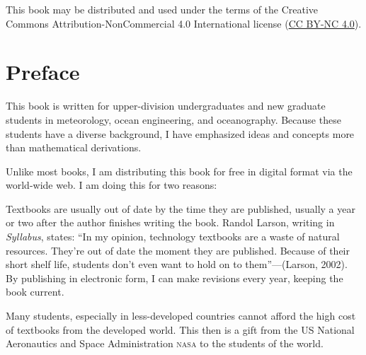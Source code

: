 
\vspace*{\fill}
\noindent{}This book may be distributed and used under the terms of the
Creative Commons Attribution-NonCommercial 4.0 International
license (\href{https://creativecommons.org/licenses/by-nc/4.0/legalcode}{CC BY-NC 4.0}).
\tableofcontents

\chapter{Preface}
This book is written for upper-division undergraduates and new
graduate students in meteorology, ocean engineering, and
oceanography. Because these students have a diverse background, I have
emphasized ideas and concepts more than mathematical derivations.

Unlike most books, I am distributing this book for free in digital
format via the world-wide web. I am doing this for two reasons:
\begin{enumerate}
\vitem Textbooks are usually out of date by the time they are
published, usually a year or two after the author finishes writing the
book. Randol Larson, writing in \textit{Syllabus}, states: ``In my
opinion, technology textbooks are a waste of natural
resources. They're out of date the moment they are published. Because
of their short shelf life, students don't even want to hold on to
them''---(Larson, 2002). By publishing in electronic form, I can make
revisions every year, keeping the book current.

\vitem Many students, especially in less-developed countries cannot
afford the high cost of textbooks from the developed world. This then
is a gift from the US National Aeronautics and Space Administration
\textsc{nasa} to the students of the world.
\end{enumerate} 

